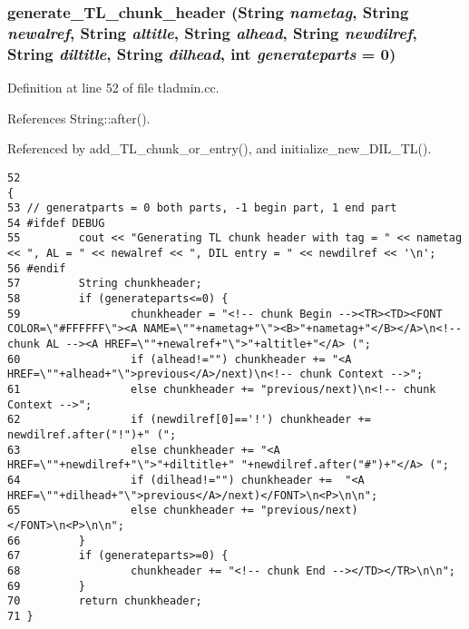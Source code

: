 \subsubsection{ generate\_\-TL\_\-chunk\_\-header ({\bf String} {\em nametag}, {\bf String} {\em newalref}, {\bf String} {\em altitle}, {\bf String} {\em alhead}, {\bf String} {\em newdilref}, {\bf String} {\em diltitle}, {\bf String} {\em dilhead}, int {\em generateparts} = 0)}\label{tladmin_8cc_a2}




Definition at line 52 of file tladmin.cc.

References String::after().

Referenced by add\_\-TL\_\-chunk\_\-or\_\-entry(), and initialize\_\-new\_\-DIL\_\-TL().



\footnotesize\begin{verbatim}52                                                                                                                                                                           {
53 // generatparts = 0 both parts, -1 begin part, 1 end part
54 #ifdef DEBUG
55         cout << "Generating TL chunk header with tag = " << nametag << ", AL = " << newalref << ", DIL entry = " << newdilref << '\n';
56 #endif
57         String chunkheader;
58         if (generateparts<=0) {
59                 chunkheader = "<!-- chunk Begin --><TR><TD><FONT COLOR=\"#FFFFFF\"><A NAME=\""+nametag+"\"><B>"+nametag+"</B></A>\n<!-- chunk AL --><A HREF=\""+newalref+"\">"+altitle+"</A> (";
60                 if (alhead!="") chunkheader += "<A HREF=\""+alhead+"\">previous</A>/next)\n<!-- chunk Context -->";
61                 else chunkheader += "previous/next)\n<!-- chunk Context -->";
62                 if (newdilref[0]=='!') chunkheader += newdilref.after("!")+" (";
63                 else chunkheader += "<A HREF=\""+newdilref+"\">"+diltitle+" "+newdilref.after("#")+"</A> (";
64                 if (dilhead!="") chunkheader +=  "<A HREF=\""+dilhead+"\">previous</A>/next)</FONT>\n<P>\n\n";
65                 else chunkheader += "previous/next)</FONT>\n<P>\n\n";
66         }
67         if (generateparts>=0) {
68                 chunkheader += "<!-- chunk End --></TD></TR>\n\n";
69         }
70         return chunkheader;             
71 }
\end{verbatim}\normalsize 
{}
